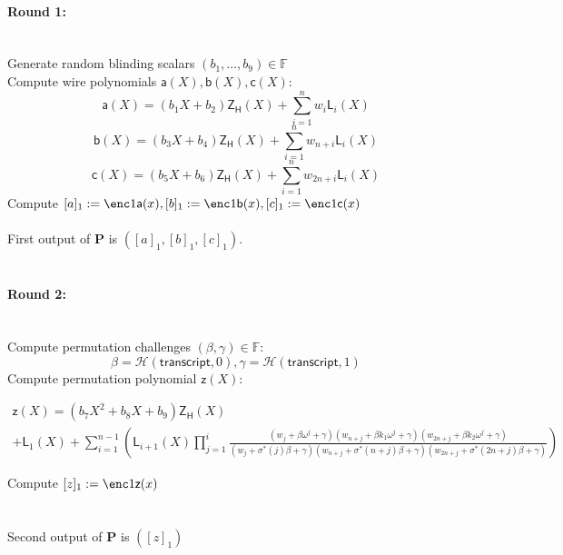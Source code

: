 \documentclass[11pt]{article} %
\newcommand{\F}{\ensuremath{\mathbb F}\xspace}
\newcommand{\hash}{\ensuremath{\mathcal{H}}\xspace}
\newcommand{\prv}{\ensuremath{\mathsf{\mathbf{P}}}\xspace}
\newcommand{\ZeroH}{\ensuremath{Z_{H}} \xspace}
\newcommand{\lpoly}{\ensuremath{\mathsf{a}}\xspace}
\newcommand{\rpoly}{\ensuremath{\mathsf{b}}\xspace}
\newcommand{\opoly}{\ensuremath{\mathsf{c}}\xspace}
\newcommand{\idpermpoly}{\ensuremath{\mathsf{z}}\xspace}
\newcommand{\lagrangepoly}{\ensuremath{\mathsf{L}}\xspace}
\newcommand{\zeropoly}{\ensuremath{\mathsf{\ZeroH}}\xspace}
\newcommand{\snark}{\ensuremath{\mathsf{snark}}\xspace}
\newcommand{\Prove}{\mathcal{P}}
\newcommand{\Psnark}{\prv}%
\newcommand{\transcript}{\ensuremath{\mathsf{transcript}}\xspace}
\begin{document}
	\paragraph{\textbf{Round 1:}} \ \\
	Generate random blinding scalars $(b_1, \ldots, b_{9}) \in \F$ \\
	Compute wire polynomials $\lpoly(X), \rpoly(X), \opoly(X):$
	$$
	\lpoly(X) = (b_1X + b_2)\zeropoly(X) + \sum_{i=1}^nw_i\lagrangepoly_i(X)
	$$
	$$
	\rpoly(X) = (b_3X + b_4)\zeropoly(X) + \sum_{i=1}^nw_{n+i}\lagrangepoly_i(X)
	$$
	$$
	\opoly(X) = (b_5X + b_6)\zeropoly(X) + \sum_{i=1}^nw_{2n+i}\lagrangepoly_i(X)
	$$
	Compute $[a]_1 := \enc1{\lpoly(x)}, [b]_1 := \enc1{\rpoly(x)}, [c]_1 := \enc1{\opoly(x)}$
	\\ \\
	First output of $\Psnark$ is $([a]_1, [b]_1, [c]_1)$.
	\\ \\
	\noindent
	\paragraph{\textbf{Round 2:}} \ \\
	Compute permutation challenges $(\beta, \gamma) \in \F:$ \[\beta = \hash(\transcript,0), \gamma = \hash(\transcript, 1) \]
	Compute permutation polynomial $\idpermpoly(X):$
	\begin{adjustwidth}{-50mm}{-50mm}
	$$ 
	\begin{array}{c}
	\idpermpoly(X) = (b_7X^2 + b_8X + b_9)\zeropoly(X) \\
	+ \lagrangepoly_1(X) + \sum_{i=1}^{n-1} \left(
	\lagrangepoly_{i+1}(X) \prod_{j=1}^i\frac{(w_j + \beta \omega^{j} + \gamma)(w_{n+j} + \beta k_1 \omega^{j} + \gamma)(w_{2n + j} + \beta k_2 \omega^{j} + \gamma)}{(w_j + \sigma^*(j)\beta + \gamma)(w_{n+j} + \sigma^*(n+j)\beta + \gamma)(w_{2n+j} + \sigma^*(2n+j)\beta + \gamma)}
	\right)
	\end{array}
	$$
	\end{adjustwidth}
	Compute $[z]_1 := \enc1{\idpermpoly(x)}$ \\
	\\ \\
	Second output of $\Psnark$ is $([z]_1)$
	\\ \\
	\noindent
\end{document}
